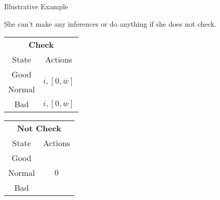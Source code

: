 \documentclass[usenames,dvipsnames,aspectratio=169,11pt, envcountsect]{beamer}
\begin{document}
\begin{frame}{Illustrative Example}

	She can't make any inferences or do anything if she does not check.

	\vfill

	\begin{table}[H]
		\centering
		\begin{minipage}{0.29\textwidth}

		\end{minipage}\hspace{0.3cm} %
		\begin{minipage}{0.29\textwidth}
			\centering
			\begin{tabular}{c | c}
				\multicolumn{2}{c}{\textbf{Check}}                                                                            \\
				State                        & Actions                                                                        \\
				\hline
				{\color{bleudefrance}Good}   & \multirow{2}{*}{{\color{bleudefrance}\( i, \left[ 0, \overline{w} \right] \)}} \\
				{\color{bleudefrance}Normal} &                                                                                \\
				Bad                          & \(  i, \left[0, w \right] \)                                                   \\
			\end{tabular}
			\vspace{0.5cm} %
		\end{minipage}\hspace{0.7cm} %
		\begin{minipage}{0.29\textwidth}
			\centering
			\begin{tabular}{c | c}
				\multicolumn{2}{c}{\textbf{Not Check}} \\
				State  & Actions                       \\
				\hline
				Good   & \multirow{3}{*}{ \( 0 \)}     \\
				Normal &                               \\
				Bad    &                               \\
			\end{tabular}
			\vspace{0.5cm} %
		\end{minipage}
	\end{table}

\end{frame}
\end{document}
